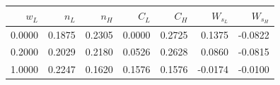 \begin{tabular}{rrrrrrr}
\toprule
$w_L$ & $n_L$ & $n_H$ & $C_L$ & $C_H$ & $W_{s_L}$ & $W_{s_H}$\\
\midrule
0.0000 & 0.1875 & 0.2305 & 0.0000 & 0.2725 & 0.1375 & -0.0822\\
0.2000 & 0.2029 & 0.2180 & 0.0526 & 0.2628 & 0.0860 & -0.0815\\
1.0000 & 0.2247 & 0.1620 & 0.1576 & 0.1576 & -0.0174 & -0.0100\\
\bottomrule
\end{tabular}